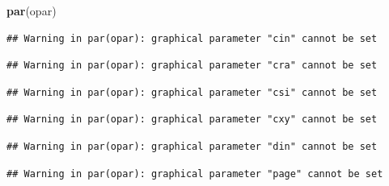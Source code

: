 \documentclass[
]{article}
\newenvironment{Shaded}{\begin{snugshade}}{\end{snugshade}}
\newcommand{\KeywordTok}[1]{\textcolor[rgb]{0.13,0.29,0.53}{\textbf{#1}}}
\newcommand{\NormalTok}[1]{#1}
\begin{document}
\begin{Shaded}
\begin{Highlighting}[]
\KeywordTok{par}\NormalTok{(opar)}
\end{Highlighting}
\end{Shaded}

\begin{verbatim}
## Warning in par(opar): graphical parameter "cin" cannot be set
\end{verbatim}

\begin{verbatim}
## Warning in par(opar): graphical parameter "cra" cannot be set
\end{verbatim}

\begin{verbatim}
## Warning in par(opar): graphical parameter "csi" cannot be set
\end{verbatim}

\begin{verbatim}
## Warning in par(opar): graphical parameter "cxy" cannot be set
\end{verbatim}

\begin{verbatim}
## Warning in par(opar): graphical parameter "din" cannot be set
\end{verbatim}

\begin{verbatim}
## Warning in par(opar): graphical parameter "page" cannot be set
\end{verbatim}
\end{document}
